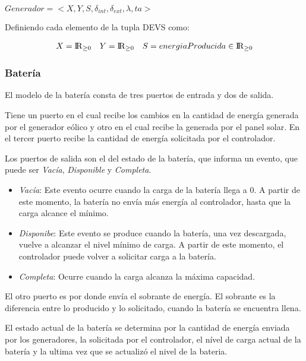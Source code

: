 $Generador = <X,Y,S,\delta_{int}, \delta_{ext}, \lambda, ta>$

Definiendo cada elemento de la tupla DEVS como:

\begin{align*}
X &= {\rm I\!R}_{\geq0} & Y &= {\rm I\!R}_{\geq0} & S &= energiaProducida \in {\rm I\!R}_{\geq 0} \\
\end{align*}




\subsubsection{Batería}
El modelo de la bater\'ia consta de tres puertos de entrada y dos de salida.

Tiene un puerto en el cual recibe los cambios en la cantidad de energ\'ia generada
por el generador eólico y otro en el cual recibe la generada por el panel solar.
En el tercer puerto recibe la cantidad de energía solicitada por el controlador.

Los puertos de salida son el del estado de la batería, que informa un evento, 
que puede ser \emph{Vacía}, \emph{Disponible} y \emph{Completa}.

\begin{itemize}
    \item \emph{Vacía}: Este evento ocurre cuando la carga de la batería llega a 0. 
    A partir de este momento, la batería no envía más energía al controlador, hasta
    que la carga alcance el mínimo.
    \item \emph{Disponibe}: Este evento se produce cuando la batería, una vez
    descargada, vuelve a alcanzar el nivel mínimo de carga. A partir de este
    momento, el controlador puede volver a solicitar carga a la batería.
    \item \emph{Completa}: Ocurre cuando la carga alcanza la máxima capacidad.
\end{itemize}

El otro puerto es por donde envía el sobrante de energía. El sobrante es la
diferencia entre lo producido y lo solicitado, cuando la batería se encuentra
llena. 

El estado actual de la batería se determina por la cantidad de energía enviada
por los generadores, la solicitada por el controlador, el nível de carga actual
de la batería y la ultima vez que se actualizó el nivel de la bateria.

